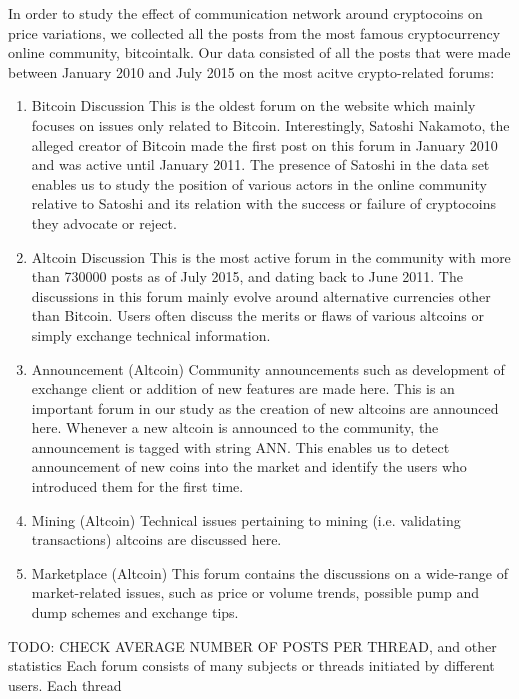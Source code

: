 In order to study the effect of communication network around cryptocoins on
price variations, we collected all the posts from the most famous cryptocurrency
online community, bitcointalk.  Our data consisted of all the posts that were
made between January 2010 and July 2015 on the most acitve crypto-related forums:
\begin{enumerate}
  \item{Bitcoin Discussion} This is the oldest forum on the website which mainly focuses
    on issues only related to Bitcoin. Interestingly, Satoshi Nakamoto, the alleged
    creator of Bitcoin made the first post on this forum in January 2010 and
    was active until January 2011. The presence of Satoshi in the data set enables us
    to study the position of various actors in the online community relative to Satoshi
    and its relation with the success or failure of cryptocoins they advocate or reject.

  \item{Altcoin Discussion} This is the most active forum in the community
    with more than 730000 posts as of July 2015, and dating back to June 2011.
    The discussions in this forum mainly evolve around alternative currencies
    other than Bitcoin. Users often discuss the merits or flaws of various
    altcoins or simply exchange technical information.
  
  \item{Announcement (Altcoin)} Community announcements such as development of 
    exchange client or addition of new features are made here. This is an important forum
    in our study as the creation of new altcoins are announced here. Whenever a new
    altcoin is announced to the community, the announcement is tagged with string ANN.
    This enables us to detect announcement of new coins into the market and identify
    the users who introduced them for the first time.

  \item{Mining (Altcoin)} Technical issues pertaining to mining (i.e. validating transactions)
    altcoins are discussed here.
  \item{Marketplace (Altcoin)} This forum contains the discussions on a wide-range of 
    market-related issues, such as price or volume trends, possible pump and dump schemes
    and exchange tips.

\end{enumerate}
TODO: CHECK AVERAGE NUMBER OF POSTS PER THREAD, and other statistics
Each forum consists of many subjects or threads initiated by different users. Each thread
